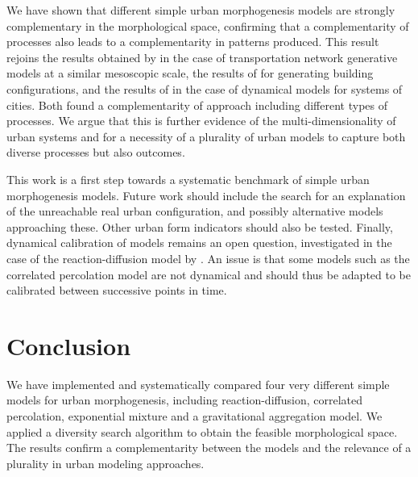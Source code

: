 \documentclass[10pt,letterpaper]{article}
\begin{document}
We have shown that different simple urban morphogenesis models are strongly complementary in the morphological space, confirming that a complementarity of processes also leads to a complementarity in patterns produced. This result rejoins the results obtained by \cite{raimbault2018multi} in the case of transportation network generative models at a similar mesoscopic scale, the results of \cite{raimbault2019generating} for generating building configurations, and the results of \cite{raimbault2018systematic} in the case of dynamical models for systems of cities. Both found a complementarity of approach including different types of processes. We argue that this is further evidence of the multi-dimensionality of urban systems and for a necessity of a plurality of urban models to capture both diverse processes but also outcomes.




This work is a first step towards a systematic benchmark of simple urban morphogenesis models. Future work should include the search for an explanation of the unreachable real urban configuration, and possibly alternative models approaching these. Other urban form indicators should also be tested. Finally, dynamical calibration of models remains an open question, investigated in the case of the reaction-diffusion model by \cite{raimbault:halshs-02406539}. An issue is that some models such as the correlated percolation model are not dynamical and should thus be adapted to be calibrated between successive points in time.

\section*{Conclusion}

We have implemented and systematically compared four very different simple models for urban morphogenesis, including reaction-diffusion, correlated percolation, exponential mixture and a gravitational aggregation model. We applied a diversity search algorithm to obtain the feasible morphological space. The results confirm a complementarity between the models and the relevance of a plurality in urban modeling approaches.


\end{document}
